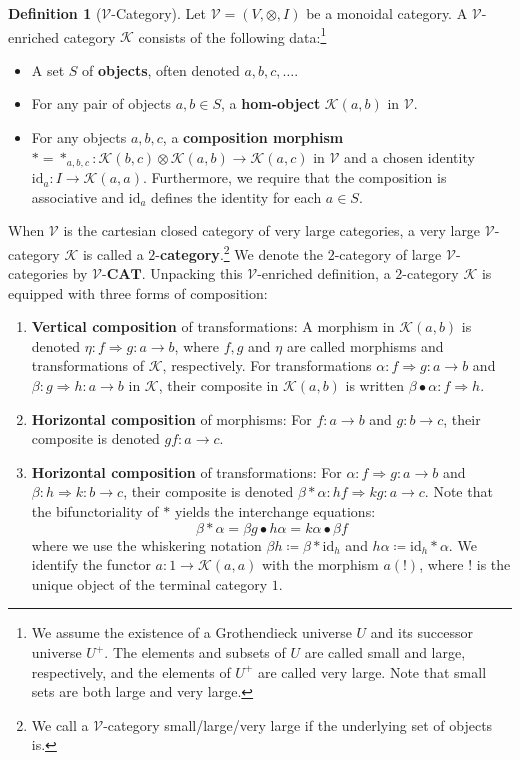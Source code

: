 \documentclass[11pt]{article}
\theoremstyle{plain}
\theoremstyle{definition}
\newtheorem{definition}[theorem]{Definition}
\numberwithin{equation}{section}
\newcommand{\K}{\mathcal{K}}
\newcommand{\CAT}{\mathbf{CAT}}
\newcommand{\id}{\mathrm{id}}
\newcommand{\V}{\mathcal{V}}
\begin{document}
\begin{definition}[$\V$-Category]
   Let $\V = (V,\otimes, I)$ be a monoidal category. A $\V$-enriched category $\K$ consists of the following data:\footnote{We assume the existence of a Grothendieck universe $U$ and its successor universe $U^+$. The elements and subsets of $U$ are called small and large, respectively, and the elements of $U^+$ are called very large. Note that small sets are both large and very large.}
   \begin{itemize}
       \item A set $S$ of \textbf{objects}, often denoted $a,b,c,\dots$.
       \item For any pair of objects $a, b\in S$, a \textbf{hom-object} $\K(a,b)$ in $\V$.
       \item For any objects $a, b, c$, a \textbf{composition morphism} $* = *_{a,b,c}\colon \K(b,c) \otimes \K(a,b) \to \K(a,c)$ in $\V$ and a chosen identity $\id_a\colon I\to \K(a,a)$. Furthermore, we require that the composition is associative and $\id_a$ defines the identity for each $a\in S$.
   \end{itemize}
   When $\V$ is the cartesian closed category of very large categories, a very large $\V$-category $\K$ is called a $2$-\textbf{category}.\footnote{We call a $\V$-category small/large/very large if the underlying set of objects is.} We denote the $2$-category of large $\V$-categories by $\V$-$\CAT$. Unpacking this $\V$-enriched definition, a $2$-category $\K$ is equipped with three forms of composition:
   \begin{enumerate}
       \item \textbf{Vertical composition} of transformations: A morphism in $\K(a,b)$ is denoted $\eta\colon f\Rightarrow g\colon a\to b$, where $f,g$ and $\eta$ are called morphisms and transformations of $\K$, respectively. For transformations $\alpha \colon f \Rightarrow g\colon a\to b$ and $\beta \colon g \Rightarrow h\colon a\to b$ in $\K$, their composite in $\K(a,b)$ is written $\beta \bullet \alpha \colon f \Rightarrow h$.
       \item \textbf{Horizontal composition} of morphisms: For $f \colon a \to b$ and $g \colon b \to c$, their composite is denoted $gf \colon a \to c$.
       \item \textbf{Horizontal composition} of transformations: For $\alpha \colon f \Rightarrow g\colon a\to b$ and $\beta \colon h \Rightarrow k\colon b\to c$, their composite is denoted $\beta * \alpha \colon hf \Rightarrow kg\colon  a\to c$. Note that the bifunctoriality of $*$ yields the interchange equations:
       $$
       \beta*\alpha = \beta g\bullet h\alpha = k\alpha\bullet \beta f
       $$where we use the whiskering notation $\beta h\coloneqq \beta*\id_h$ and $h\alpha\coloneqq \id_h*\alpha$. We identify the functor $a\colon 1\to \K(a,a)$ with the morphism $a(!)$, where $!$ is the unique object of the terminal category $1$. 
   \end{enumerate}
\end{definition}
\end{document}

